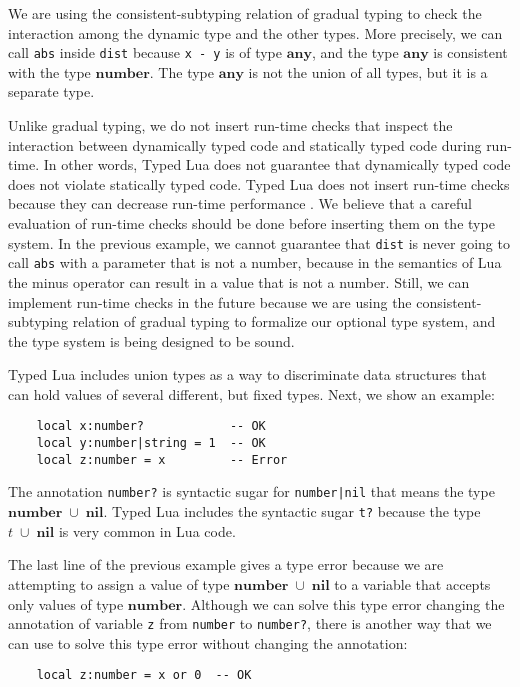 \documentclass[preprint]{sig-alternate}
\newcommand{\Any}{\mathbf{any}}
\newcommand{\Nil}{\mathbf{nil}}
\newcommand{\Number}{\mathbf{number}}
\begin{document}
We are using the consistent-subtyping relation of gradual
typing to check the interaction among the dynamic type and the other
types.
More precisely, we can call \verb'abs' inside \verb'dist' because
\verb'x - y' is of type $\Any$, and the type $\Any$ is
consistent with the type $\Number$.
The type $\Any$ is not the union of all types, but it is a separate
type.

Unlike gradual typing, we do not insert run-time checks that
inspect the interaction between dynamically typed code and statically
typed code during run-time.
In other words, Typed Lua does not guarantee that dynamically typed
code does not violate statically typed code.
Typed Lua does not insert run-time checks because they can decrease
run-time performance \cite{allende2013cis}.
We believe that a careful evaluation of run-time checks should be done
before inserting them on the type system.
In the previous example, we cannot guarantee that \verb'dist' is never
going to call \verb'abs' with a parameter that is not a number,
because in the semantics of Lua the minus operator can result in a
value that is not a number.
Still, we can implement run-time checks in the future because we are
using the consistent-subtyping relation of gradual typing to
formalize our optional type system, and the type system is being
designed to be sound.

Typed Lua includes union types as a way to discriminate data
structures that can hold values of several different, but fixed types.
Next, we show an example:
\begin{verbatim}
    local x:number?            -- OK
    local y:number|string = 1  -- OK
    local z:number = x         -- Error
\end{verbatim}

The annotation \verb'number?' is syntactic sugar for
\verb'number|nil' that means the type $\Number\;\cup\;\Nil$.
Typed Lua includes the syntactic sugar \verb't?' because the
type $t\;\cup\;\Nil$ is very common in Lua code.

The last line of the previous example gives a type error because we
are attempting to assign a value of type $\Number\;\cup\;\Nil$
to a variable that accepts only values of type $\Number$.
Although we can solve this type error changing the annotation of
variable \verb'z' from \verb'number' to \verb'number?', there is
another way that we can use to solve this type error without changing
the annotation:
\begin{verbatim}
    local z:number = x or 0  -- OK
\end{verbatim}
\end{document}
